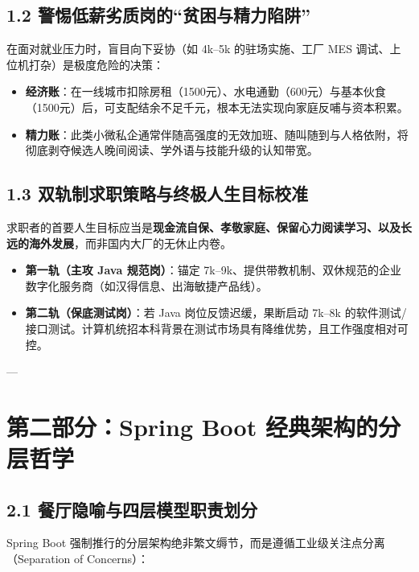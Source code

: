 \documentclass[11pt,a4paper]{ctexart}
\begin{document}
\subsection{1.2 警惕低薪劣质岗的“贫困与精力陷阱”}
在面对就业压力时，盲目向下妥协（如 4k--5k 的驻场实施、工厂 MES 调试、上位机打杂）是极度危险的决策：
\begin{itemize}
    \item \textbf{经济账}：在一线城市扣除房租（1500元）、水电通勤（600元）与基本伙食（1500元）后，可支配结余不足千元，根本无法实现向家庭反哺与资本积累。
    \item \textbf{精力账}：此类小微私企通常伴随高强度的无效加班、随叫随到与人格依附，将彻底剥夺候选人晚间阅读、学外语与技能升级的认知带宽。
\end{itemize}

\subsection{1.3 双轨制求职策略与终极人生目标校准}
求职者的首要人生目标应当是\textbf{现金流自保、孝敬家庭、保留心力阅读学习、以及长远的海外发展}，而非国内大厂的无休止内卷。
\begin{itemize}
    \item \textbf{第一轨（主攻 Java 规范岗）}：锚定 7k--9k、提供带教机制、双休规范的企业数字化服务商（如汉得信息、出海敏捷产品线）。
    \item \textbf{第二轨（保底测试岗）}：若 Java 岗位反馈迟缓，果断启动 7k--8k 的软件测试/接口测试。计算机统招本科背景在测试市场具有降维优势，且工作强度相对可控。
\end{itemize}

---

\section{第二部分：Spring Boot 经典架构的分层哲学}

\subsection{2.1 餐厅隐喻与四层模型职责划分}
Spring Boot 强制推行的分层架构绝非繁文缛节，而是遵循工业级关注点分离（Separation of Concerns）：
\end{document}
